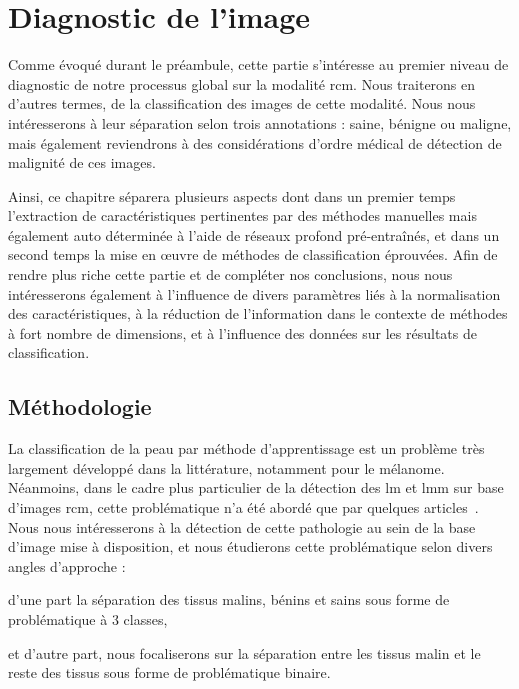 \renewcommand{\thechapter}{\arabic{chapter}}
\setcounter{chapter}{4}

\chapter{Diagnostic de l'image}
\label{chap:chapter_4}
\chapterintro
Comme évoqué durant le préambule, cette partie s'intéresse au premier niveau de diagnostic de notre processus global sur la modalité \gls{rcm}. Nous traiterons en d'autres termes, de la classification des images de cette modalité. Nous nous intéresserons à leur séparation selon trois annotations : saine, bénigne ou maligne, mais également reviendrons à des considérations d'ordre médical de détection de malignité de ces images.\par

Ainsi, ce chapitre séparera plusieurs aspects dont dans un premier temps l'extraction de caractéristiques pertinentes par des méthodes manuelles mais également auto déterminée à l'aide de réseaux profond pré-entraînés, et dans un second temps la mise en œuvre de méthodes de classification éprouvées. Afin de rendre plus riche cette partie et de compléter nos conclusions, nous nous intéresserons également à l'influence de divers paramètres liés à la normalisation des caractéristiques, à la réduction de l'information dans le contexte de méthodes à fort nombre de dimensions, et à l'influence des données sur les résultats de classification.\par	
\newpage

\section{Méthodologie}
La classification de la peau par méthode d'apprentissage est un problème très largement développé dans la littérature, notamment pour le mélanome. Néanmoins, dans le cadre plus particulier de la détection des \gls{lm} et \gls{lmm} sur base d'images \gls{rcm}, cette problématique n'a été abordé que par quelques articles~\cite{Halimi2017a, Halimi2017b, Wiltgen2008, Koller2011}. Nous nous intéresserons à la détection de cette pathologie au sein de la base d'image mise à disposition, et nous étudierons cette problématique selon divers angles d'approche : 
\begin{inlinerate}
    \item d'une part la séparation des tissus malins, bénins et sains sous forme de problématique à 3 classes,
    \item et d'autre part, nous focaliserons sur la séparation entre les tissus malin et le reste des tissus sous forme de problématique binaire.
\end{inlinerate}\par

